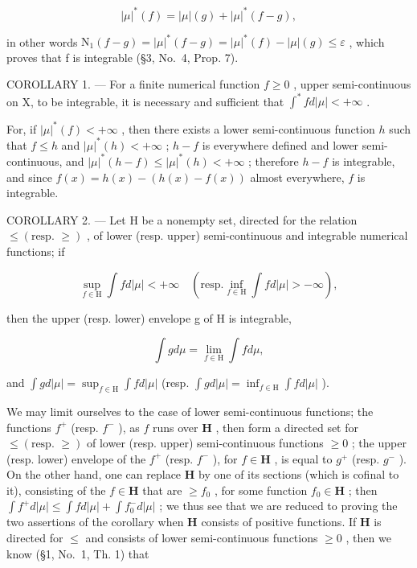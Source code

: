\[
| \mu | ^ {*} (f) = | \mu | (g) + | \mu | ^ {*} (f - g),
\]

in other words \(\mathrm{N}_{1}(f-g)=|\mu|^{*}(f-g)=|\mu|^{*}(f)-|\mu|(g)\leqslant\varepsilon\) , which proves that f is integrable (§3, No.~4, Prop. 7).

COROLLARY 1. --- For a finite numerical function \(f \geqslant 0\) , upper semi-continuous on X, to be integrable, it is necessary and sufficient that \(\int^{*} f d|\mu| < +\infty\) .

For, if \(|\mu|^*(f) < +\infty\) , then there exists a lower semi-continuous function \(h\) such that \(f \leqslant h\) and \(|\mu|^*(h) < +\infty\) ; \(h - f\) is everywhere defined and lower semi-continuous, and \(|\mu|^*(h - f) \leqslant |\mu|^*(h) < +\infty\) ; therefore \(h - f\) is integrable, and since \(f(x) = h(x) - (h(x) - f(x))\) almost everywhere, \(f\) is integrable.

COROLLARY 2. --- Let H be a nonempty set, directed for the relation \(\leqslant (\text{resp. } \geqslant)\) , of lower (resp. upper) semi-continuous and integrable numerical functions; if

\[
\sup _ {f \in \mathrm{H}} \int f d | \mu | <   + \infty \quad (\mathrm{resp.} \inf _ {f \in \mathrm{H}} \int f d | \mu | > - \infty),
\]

then the upper (resp. lower) envelope g of H is integrable,

\[
\int g d \mu = \lim _ {f \in \mathrm{H}} \int f d \mu ,
\]

and \(\int g d|\mu| = \sup_{f\in \mathrm{H}}\int f d|\mu|\) (resp. \(\int g d|\mu| = \inf_{f\in \mathrm{H}}\int f d|\mu|\) ).

We may limit ourselves to the case of lower semi-continuous functions; the functions \(f^{+}\) (resp. \(f^{-}\) ), as \(f\) runs over \(\mathbf{H}\) , then form a directed set for \(\leqslant (\text{resp. } \geqslant)\) of lower (resp. upper) semi-continuous functions \(\geqslant 0\) ; the upper (resp. lower) envelope of the \(f^{+}\) (resp. \(f^{-}\) ), for \(f \in \mathbf{H}\) , is equal to \(g^{+}\) (resp. \(g^{-}\) ). On the other hand, one can replace \(\mathbf{H}\) by one of its sections (which is cofinal to it), consisting of the \(f \in \mathbf{H}\) that are \(\geqslant f_{0}\) , for some function \(f_{0} \in \mathbf{H}\) ; then \(\int f^{+} d|\mu| \leqslant \int f d|\mu| + \int f_{0}^{-} d|\mu|\) ; we thus see that we are reduced to proving the two assertions of the corollary when \(\mathbf{H}\) consists of positive functions. If \(\mathbf{H}\) is directed for \(\leqslant\) and consists of lower semi-continuous functions \(\geqslant 0\) , then we know (§1, No.~1, Th. 1) that


